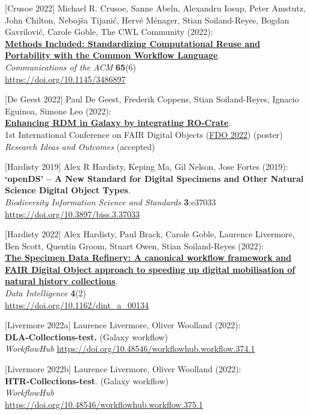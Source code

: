 {[}Crusoe 2022{]} Michael R. Crusoe, Sanne Abeln, Alexandru Iosup, Peter
Amstutz, John Chilton, Nebojša Tijanić, Hervé Ménager, Stian
Soiland-Reyes, Bogdan Gavrilović, Carole Goble, The CWL Community
(2022):\\
\href{../methods=included/}{\textbf{Methods Included: Standardizing
Computational Reuse and Portability with the Common Workflow
Language}}.\\
\emph{Communications of the ACM} \textbf{65}(6)\\
\url{https://doi.org/10.1145/3486897}

{[}De Geest 2022{]} Paul De Geest, Frederik Coppens, Stian
Soiland-Reyes, Ignacio Eguinoa, Simone Leo (2022):\\
\href{../galaxy-ro-crate/}{\textbf{Enhancing RDM in Galaxy by
integrating RO-Crate}}.\\
1st International Conference on FAIR Digital Objects
(\href{https://www.fdo2022.org/}{FDO 2022}) (poster)\\
\emph{Research Ideas and Outcomes} (accepted)

{[}Hardisty 2019{]} Alex R Hardisty, Keping Ma, Gil Nelson, Jose Fortes
(2019):\\
\textbf{`openDS' -- A New Standard for Digital Specimens and Other
Natural Science Digital Object Types}.\\
\emph{Biodiversity Information Science and Standards}
\textbf{3}:e37033\\
\url{https://doi.org/10.3897/biss.3.37033}

{[}Hardisty 2022{]} Alex Hardisty, Paul Brack, Carole Goble, Laurence
Livermore, Ben Scott, Quentin Groom, Stuart Owen, Stian Soiland-Reyes
(2022):\\
\href{../specimen-data-refinery/}{\textbf{The Specimen Data Refinery: A
canonical workflow framework and FAIR Digital Object approach to
speeding up digital mobilisation of natural history collections}}.\\
\emph{Data Intelligence} \textbf{4}(2)\\
\url{https://doi.org/10.1162/dint_a_00134}

{[}Livermore 2022a{]} Laurence Livermore, Oliver Woolland (2022):\\
\textbf{DLA-Collections-test.} (Galaxy workflow)\\
\emph{WorkflowHub}
\url{https://doi.org/10.48546/workflowhub.workflow.374.1}

{[}Livermore 2022b{]} Laurence Livermore, Oliver Woolland (2022):\\
\textbf{HTR-Collections-test}. (Galaxy workflow)\\
\emph{WorkflowHub}\\
\url{https://doi.org/10.48546/workflowhub.workflow.375.1}

